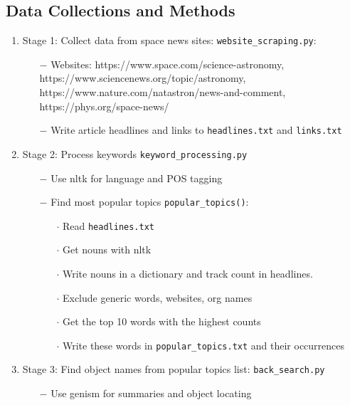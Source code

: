\documentclass[12pt,letterpaper]{article}
\begin{document}
\subsection*{Data Collections and Methods}
\begin{enumerate}[leftmargin=*]
    \item Stage 1: Collect data from space news sites:  \texttt{website\_scraping.py}:
        \begin{enumerate}
            \item [$-$] Websites: https://www.space.com/science-astronomy, \\
            https://www.sciencenews.org/topic/astronomy, \\ 
            https://www.nature.com/natastron/news-and-comment, \\ 
            https://phys.org/space-news/
            \item [$-$] Write article headlines and links to \texttt{headlines.txt} and \texttt{links.txt}
        \end{enumerate}
    \item Stage 2: Process keywords \texttt{keyword\_processing.py}
        \begin{enumerate}
            \item [$-$] Use nltk for language and POS tagging
            \item [$-$] Find most popular topics \texttt{popular\_topics()}:
            \begin{enumerate}[leftmargin=*]
                \item[$\cdot$] Read \texttt{headlines.txt}
                \item[$\cdot$]Get nouns with nltk
                \item[$\cdot$]Write nouns in a dictionary and track count in headlines.
                \item[$\cdot$]Exclude generic words, websites, org names
                \item[$\cdot$]Get the top 10 words with the highest counts
                \item[$\cdot$]Write these words in \texttt{popular\_topics.txt} and 
                  their occurrences
            \end{enumerate}
        \end{enumerate}
    \item Stage 3: Find object names from popular topics list:
    \texttt{back\_search.py}
        \begin{enumerate}
            \item [$-$] Use genism for summaries and object locating

\end{enumerate}
\end{enumerate}
\end{document}
